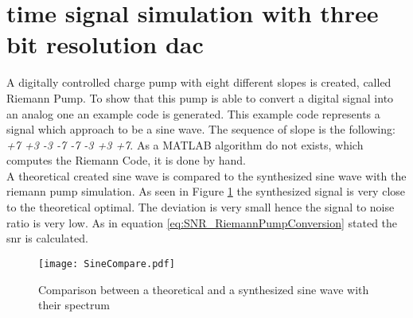 
\section{time signal simulation with three bit resolution dac}
A digitally controlled charge pump with eight different slopes is created, called Riemann Pump. To show that this pump is able to convert a digital signal into an analog one an example code is generated. This example code represents a signal which approach to be a sine wave. The sequence of slope is the following: \textit{+7 +3 -3 -7 -7 -3 +3 +7}. As a MATLAB algorithm do not exists, which computes the Riemann Code, it is done by hand.
\\
A theoretical created sine wave is compared to the synthesized sine wave with the riemann pump simulation. As seen in Figure \ref{fig:SineCompare} the synthesized signal is very close to the theoretical optimal. The deviation is very small hence the signal to noise ratio is very low. As in equation \ref{eq:SNR_RiemannPumpConversion} stated the snr is calculated.
\begin{figure}[ht]
	\centering
  \texttt{[image: SineCompare.pdf]}
	\caption{Comparison between a theoretical and a synthesized sine wave with their spectrum}
	\label{fig:SineCompare}
\end{figure}

